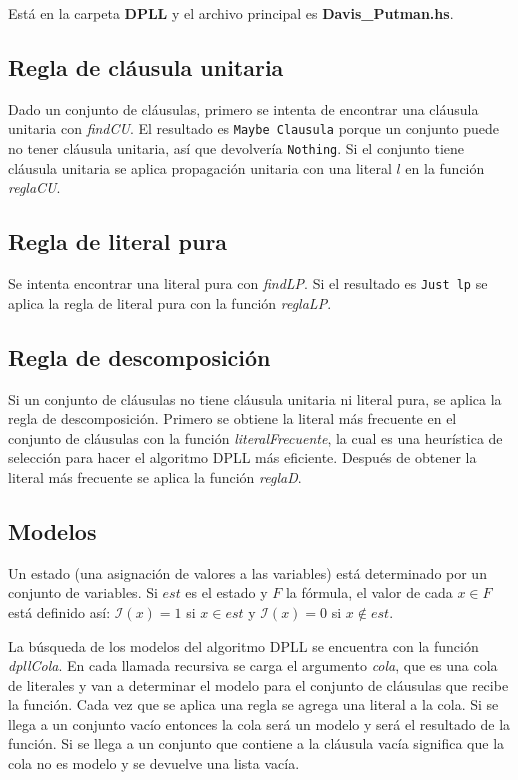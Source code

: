 \documentclass{article}
\begin{document}
Está en la carpeta \textbf{DPLL} y el archivo principal es \textbf{Davis\_Putman.hs}.

\subsection{Regla de cláusula unitaria}

Dado un conjunto de cláusulas, primero se intenta de encontrar una cláusula unitaria con \textit{findCU}. El resultado es \texttt{Maybe Clausula} porque un conjunto puede no tener cláusula unitaria, así que devolvería \texttt{Nothing}. Si el conjunto tiene cláusula unitaria se aplica propagación unitaria con una literal $l$ en la función \textit{reglaCU}.

\subsection{Regla de literal pura}

Se intenta encontrar una literal pura con \textit{findLP}. Si el resultado es \texttt{Just lp} se aplica la regla de literal pura con la función \textit{reglaLP}.

\subsection{Regla de descomposición}

Si un conjunto de cláusulas no tiene cláusula unitaria ni literal pura, se aplica la regla de descomposición. Primero se obtiene la literal más frecuente en el conjunto de cláusulas con la función \textit{literalFrecuente}, la cual es una heurística de selección para hacer el algoritmo DPLL más eficiente. Después de obtener la literal más frecuente se aplica la función \textit{reglaD}.


\subsection{Modelos}

Un estado (una asignación de valores a las variables) está determinado por un conjunto de variables. Si $est$ es el estado y $F$ la fórmula, el valor de cada $x \in F$ está definido así: $\mathcal{I} (x) = 1$ si $x \in est$ y $\mathcal{I} (x) = 0$ si $x \not \in est$.

La búsqueda de los modelos del algoritmo DPLL se encuentra con la función \textit{dpllCola}. En cada llamada recursiva se carga el argumento \textit{cola}, que es una cola de literales y van a determinar el modelo para el conjunto de cláusulas que recibe la función. Cada vez que se aplica una regla se agrega una literal a la cola. Si se llega a un conjunto vacío entonces la cola será un modelo y será el resultado de la función. Si se llega a un conjunto que contiene a la cláusula vacía significa que la cola no es modelo y se devuelve una lista vacía.
\end{document}
